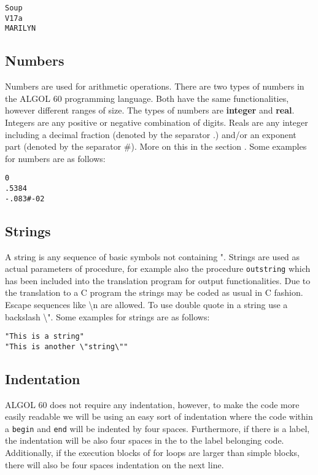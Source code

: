 \documentclass{article}
\begin{document}
\begin{lstlisting}[language={[60]algol}]
Soup
V17a
MARILYN
\end{lstlisting}

\subsection{Numbers} \label{numbers}
Numbers are used for arithmetic operations. There are two types of numbers in the ALGOL 60 programming language. Both have the same functionalities, however different ranges of size. The types of numbers are \textbf{integer} and \textbf{real}. Integers are any positive or negative combination of digits. Reals are any integer including a decimal fraction (denoted by the separator .) and/or an exponent part (denoted by the separator \#). More on this in the section . Some examples for numbers are as follows:\\

\begin{lstlisting}[language={[60]algol}]
0
.5384
-.083#-02
\end{lstlisting}

\subsection{Strings}
A string is any sequence of basic symbols not containing ". Strings are used as actual parameters of procedure, for example also the procedure \texttt{outstring} which has been included into the translation program for output functionalities. Due to the translation to a C program the strings may be coded as usual in C fashion. Escape sequences like \textbackslash n are allowed. To use double quote in a string use a backslash \textbackslash". Some examples for strings are as follows:\\

\begin{lstlisting}[language={[60]algol}]
"This is a string"
"This is another \"string\""
\end{lstlisting}

\subsection{Indentation}
ALGOL 60 does not require any indentation, however, to make the code more easily readable we will be using an easy sort of indentation where the code within a \texttt{begin} and \texttt{end} will be indented by four spaces. Furthermore, if there is a label, the indentation will be also four spaces in the to the label belonging code. Additionally, if the execution blocks of for loops are larger than simple blocks, there will also be four spaces indentation on the next line.
\end{document}
